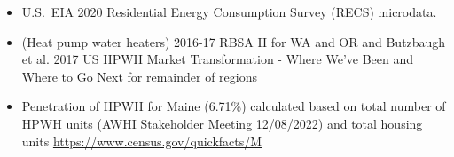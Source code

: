 \begin{itemize}
\item U.S.~EIA 2020 Residential Energy Consumption Survey (RECS) microdata.
\item (Heat pump water heaters) 2016-17 RBSA II for WA and OR and Butzbaugh et al. 2017 US HPWH Market Transformation - Where We've Been and Where to Go Next for remainder of regions
\item Penetration of HPWH for Maine (6.71\%) calculated based on total number of HPWH units (AWHI Stakeholder Meeting 12/08/2022) and total housing units \href{https://www.census.gov/quickfacts/ME}{https://www.census.gov/quickfacts/M}
\end{itemize}
